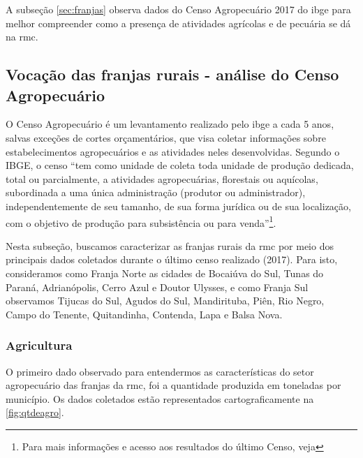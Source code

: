 	A subseção \autoref{sec:franjas} observa dados do Censo Agropecuário 2017 do \glsdesc{ibge} para melhor compreender como a presença de atividades agrícolas e de pecuária se dá na \glsdesc{rmc}.
	
	\subsection{Vocação das franjas rurais - análise do Censo Agropecuário} \label{sec:franjas}
	
	O Censo Agropecuário é um levantamento realizado pelo \gls{ibge} a cada 5 anos, salvas exceções de cortes orçamentários, que visa coletar informações sobre estabelecimentos agropecuários e as atividades neles desenvolvidas. Segundo o IBGE, o censo ``tem como unidade de coleta toda unidade de produção dedicada, total ou parcialmente, a atividades agropecuárias, florestais ou aquícolas, subordinada a uma única administração (produtor ou administrador), independentemente de seu tamanho, de sua forma jurídica ou de sua localização, com o objetivo de produção para subsistência ou para venda''\footnote{Para mais informações e acesso aos resultados do último Censo, veja }.
	
	Nesta subseção, buscamos caracterizar as franjas rurais da \gls{rmc} por meio dos principais dados coletados durante o último censo realizado (2017). Para isto, consideramos como Franja Norte as cidades de Bocaiúva do Sul, Tunas do Paraná, Adrianópolis, Cerro Azul e Doutor Ulysses, e como Franja Sul observamos Tijucas do Sul, Agudos do Sul, Mandirituba, Piên, Rio Negro, Campo do Tenente, Quitandinha, Contenda, Lapa e Balsa Nova.
	
	\subsubsection{Agricultura}
	
	O primeiro dado observado para entendermos as características do setor agropecuário das franjas da \glsdesc{rmc}, foi a quantidade produzida em toneladas por município. Os dados coletados estão representados cartograficamente na \autoref{fig:qtdeagro}.
	
